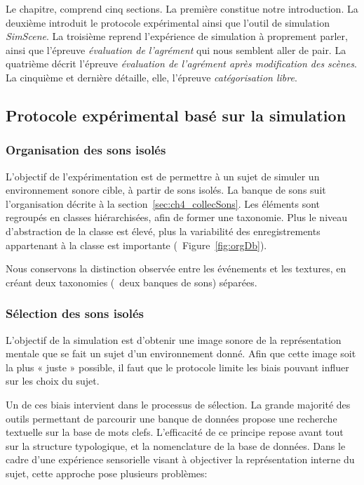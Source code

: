 Le chapitre, comprend cinq sections. La première constitue notre introduction. La deuxième introduit le protocole expérimental ainsi que l'outil de simulation \emph{SimScene}. La troisième reprend l'expérience de simulation à proprement parler, ainsi que l'épreuve \emph{évaluation de l'agrément} qui nous semblent aller de pair. La quatrième décrit l'épreuve \emph{évaluation de l'agrément après modification des scènes}. La cinquième et dernière détaille, elle, l'épreuve \emph{catégorisation libre}.

 
\subsection{Protocole expérimental basé sur la simulation}

\subsubsection{Organisation des sons isolés}
\label{sec:ch4_dbEventTexture}

L'objectif de l'expérimentation est de permettre à un sujet de simuler un environnement sonore cible, à partir de sons isolés. La banque de sons suit l'organisation décrite à la section~\ref{sec:ch4_collecSons}. Les éléments sont regroupés en classes hiérarchisées, afin de former une taxonomie. Plus le niveau d'abstraction de la classe est élevé, plus la variabilité des enregistrements appartenant à la classe est importante (\cf~Figure~\ref{fig:orgDb}).
 
Nous conservons la distinction observée entre les événements et les textures, en créant deux taxonomies (\ie~deux banques de sons) séparées.

\subsubsection{Sélection des sons isolés}

L'objectif de la simulation est d'obtenir une image sonore de la représentation mentale que se fait un sujet d'un environnement donné. Afin que cette image soit la plus « juste » possible, il faut que le protocole limite les biais pouvant influer sur les choix du sujet.

Un de ces biais intervient dans le processus de sélection. La grande majorité des outils permettant de parcourir une banque de données propose une recherche textuelle sur la base de mots clefs. L’efficacité de ce principe repose avant tout sur la structure typologique, et la nomenclature de la base de données. Dans le cadre d'une expérience sensorielle visant à objectiver la représentation interne du sujet, cette approche pose plusieurs problèmes:

